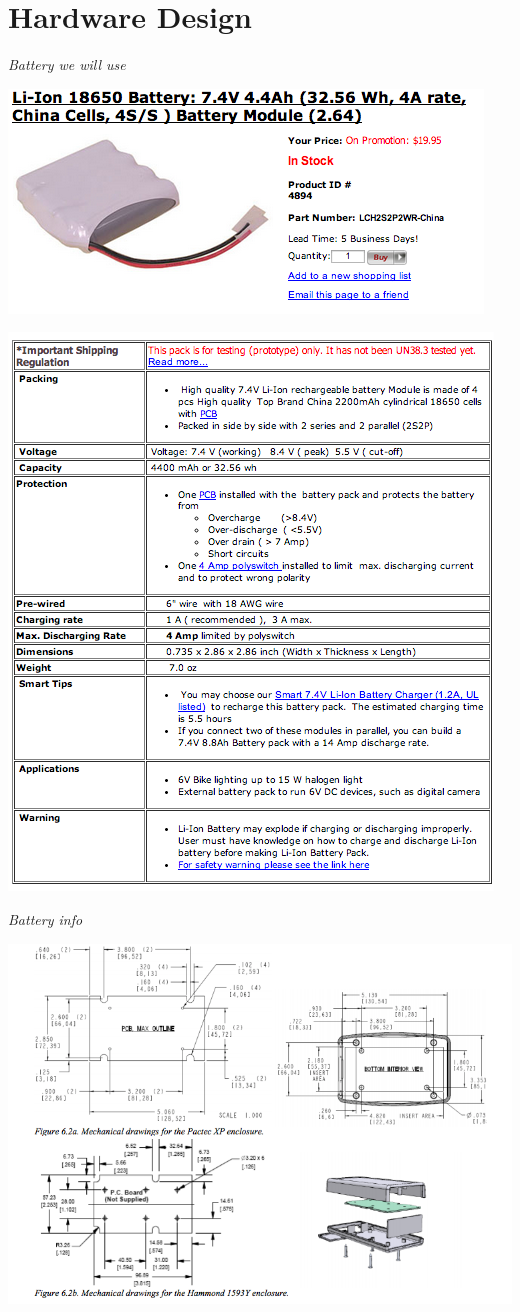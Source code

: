 \documentclass[twoside]{article}
\begin{document}
\section*{Hardware Design}
\emph{Battery we will use}\\
\centerline{\includegraphics[width=\textwidth]{Battery}}
\centerline{\includegraphics[width=\textwidth]{Battery_Info}}
\emph{Battery info}\\
\centerline{\includegraphics[width=\textwidth]{Box}}
\end{document}
